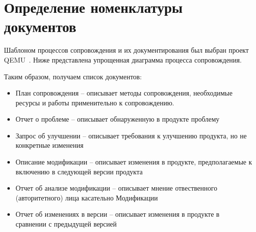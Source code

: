 
\pagebreak


\section{Определение номенклатуры документов}

Шаблоном процессов сопровождения и их документирования был выбран проект QEMU\ \cite{qemucontribute}.
Ниже представлена упрощенная диаграмма процесса сопровождения.

\begin{figure}[ht]
    \begin{center}
    \end {center}\label{fig:maintenance_process}
\end {figure}

Таким образом, получаем список документов:

\begin{itemize}
    \item План сопровождения -- описывает методы сопровождения, необходимые ресурсы и работы применительно к сопровождению.

    \item Отчет о проблеме -- описывает обнаруженную в продукте проблему

    \item Запрос об улучшении -- описывает требования к улучшению продукта, но не конкретные изменения

    \item Описание модификации -- описывает изменения в продукте, предполагаемые к включению в следующей версии продукта

    \item Отчет об анализе модификации -- описывает мнение отвественного (авторитетного) лица касательно Модификации

    \item Отчет об изменениях в версии -- описывает изменения в продукте в сравнении с предыдущей версией
\end{itemize}
